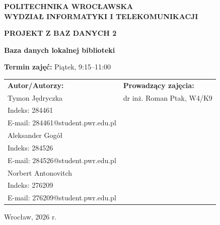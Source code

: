 \documentclass[11pt, a4paper]{article}
\begin{document}
\begin{titlepage}
    \begin{center}
        \vspace*{1cm}
        
        \Large \textbf{POLITECHNIKA WROCŁAWSKA}\\
        \Large \textbf{WYDZIAŁ INFORMATYKI I TELEKOMUNIKACJI}
        
        \vspace{3cm}
        
        \Large \textbf{PROJEKT Z BAZ DANYCH 2}
        
        \vspace{1cm}
        
        \Huge \textbf{Baza danych lokalnej biblioteki}
        
        \vspace{3cm}
    \end{center}
    
    \large
    \begin{flushleft}
        \textbf{Termin zajęć:} Piątek, 9:15–11:00\\[1cm]
        
\begin{tabular}{@{}p{8cm} p{7cm}@{}}
            \textbf{Autor/Autorzy:} & \textbf{Prowadzący zajęcia:} \\
            Tymon Jędryczka & dr inż. Roman Ptak, W4/K9 \\
            Indeks: 284461 & \\
            E-mail: 284461@student.pwr.edu.pl & \\[0.5cm] %
            
            Aleksander Gogół & \\
            Indeks: 284526 & \\
            E-mail: 284526@student.pwr.edu.pl & \\[0.5cm]

            Norbert Antonovitch & \\
            Indeks: 276209 & \\
            E-mail: 276209@student.pwr.edu.pl & \\
        \end{tabular}
    \end{flushleft}
    
    \vfill
    
    \begin{center}
        \large Wrocław, 2026 r.
    \end{center}
\end{titlepage}
\end{document}
